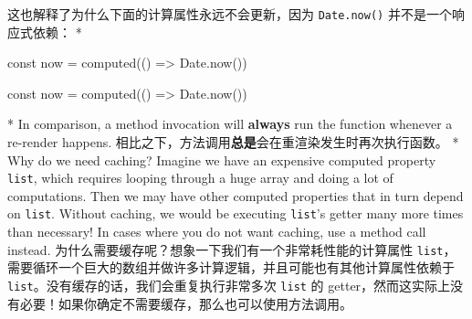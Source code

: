 \begin{paracol}{2}
\switchcolumn
这也解释了为什么下面的计算属性永远不会更新，因为 \texttt{Date.now()}
并不是一个响应式依赖：
\switchcolumn[0]*%
\begin{codeJs}
const now = computed(() => Date.now())
\end{codeJs}
\switchcolumn
\begin{codeJs}
const now = computed(() => Date.now())
\end{codeJs}
\switchcolumn[0]*%
In comparison, a method invocation will \textbf{always} run the function
whenever a re-render happens.
\switchcolumn
相比之下，方法调用\textbf{总是}会在重渲染发生时再次执行函数。
\switchcolumn[0]*%
Why do we need caching? Imagine we have an expensive computed property
\texttt{list}, which requires looping through a huge array and doing a
lot of computations. Then we may have other computed properties that in
turn depend on \texttt{list}. Without caching, we would be executing
\texttt{list}'s getter many more times than necessary! In cases where
you do not want caching, use a method call instead.
\switchcolumn
为什么需要缓存呢？想象一下我们有一个非常耗性能的计算属性
\texttt{list}，需要循环一个巨大的数组并做许多计算逻辑，并且可能也有其他计算属性依赖于
\texttt{list}。没有缓存的话，我们会重复执行非常多次 \texttt{list} 的
getter，然而这实际上没有必要！如果你确定不需要缓存，那么也可以使用方法调用。
\end{paracol}


